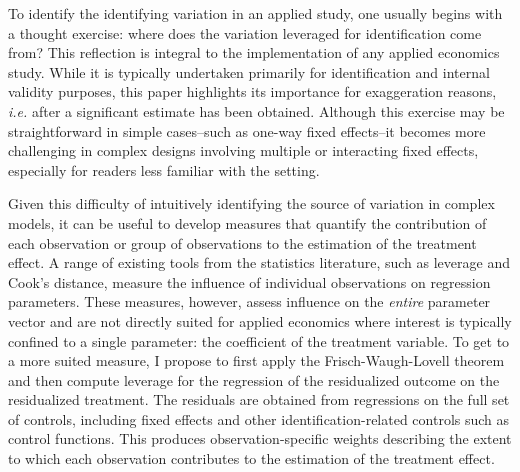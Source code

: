 \documentclass[usletter, 12pt]{article}
\begin{document}
				To identify the identifying variation in an applied study, one usually begins with a thought exercise: where does the variation leveraged for identification come from? This reflection is integral to the implementation of any applied economics study. While it is typically undertaken primarily for identification and internal validity purposes, this paper highlights its importance for exaggeration reasons, \textit{i.e.} after a significant estimate has been obtained. Although this exercise may be straightforward in simple cases--such as one-way fixed effects--it becomes more challenging in complex designs involving multiple or interacting fixed effects, especially for readers less familiar with the setting.
			
				Given this difficulty of intuitively identifying the source of variation in complex models, it can be useful to develop measures that quantify the contribution of each observation or group of observations to the estimation of the treatment effect. A range of existing tools from the statistics literature, such as leverage and Cook’s distance, measure the influence of individual observations on regression parameters. These measures, however, assess influence on the \textit{entire} parameter vector and are not directly suited for applied economics where interest is typically confined to a single parameter: the coefficient of the treatment variable. To get to a more suited measure, I propose to first apply the Frisch-Waugh-Lovell theorem and then compute leverage for the regression of the residualized outcome on the residualized treatment. The residuals are obtained from regressions on the full set of controls, including fixed effects and other identification-related controls such as control functions. This produces observation-specific weights describing the extent to which each observation contributes to the estimation of the treatment effect. 
			
\end{document}
